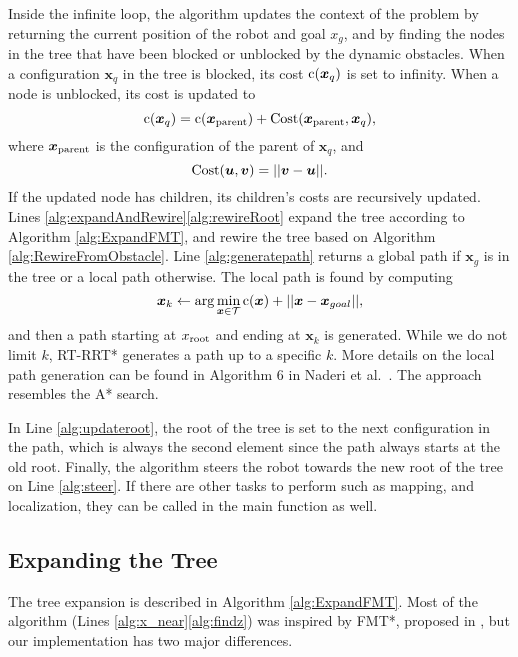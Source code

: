 Inside the infinite loop, the algorithm updates the context of the problem by returning the current position of the robot and goal $x_{g}$, and by finding the nodes in the tree that have been blocked or unblocked by the dynamic obstacles. When a configuration $\bm x_q$ in the tree is blocked, its cost $\textup{c}(\bm x_q)$ is set to infinity. When a node is unblocked, its cost is updated to
\begin{equation}
    \textup{c}(\bm x_q) = \textup{c}(\bm x_{\rm parent}) + \textup{Cost}(\bm x_{\rm parent}, \bm x_{q}), \label{eq:cost}
\end{equation}
where $\bm x_{\rm parent}$ is the configuration of the parent of $\bm x_q$, and
\begin{equation}
    \textup{Cost}(\bm u, \bm v) = ||\bm v- \bm u||.
\end{equation}
If the updated node has children, its children's costs are recursively updated. Lines \ref{alg:expandAndRewire}\textendash\ref{alg:rewireRoot} expand the tree according to Algorithm \ref{alg:ExpandFMT}, and rewire the tree based on Algorithm \ref{alg:RewireFromObstacle}. Line \ref{alg:generatepath} returns a global path if $\bm x_g$ is in the tree or a local path otherwise. The local path is found by computing 
\begin{equation}
    \bm x_k \leftarrow \arg\min_{\bm x \in \mathcal{T}}\textup{c}(\bm x) +  ||\bm x -\bm x_{goal}||,
\end{equation}
and then a path starting at $x_{\rm root}$ and ending at $\bm x_k$ is generated. While we do not limit $k$, RT-RRT* generates a path up to a specific $k$. More details on the local path generation can be found in Algorithm 6 in Naderi et al.~\cite{naderi2015rt}. The approach resembles the A* search. 

In Line \ref{alg:updateroot}, the root of the tree is set to the next configuration in the path, which is always the second element since the path always starts at the old root.  Finally, the algorithm steers the robot towards the new root of the tree on Line \ref{alg:steer}. If there are other tasks to perform such as mapping, and localization, they can be called in the main function as well. 


\subsection{Expanding the Tree}

The tree expansion is described  in Algorithm \ref{alg:ExpandFMT}. Most of the algorithm (Lines \ref{alg:x_near}\textendash\ref{alg:findz}) was inspired by FMT*, proposed in \cite{fmt}, but our implementation has two major differences. 

